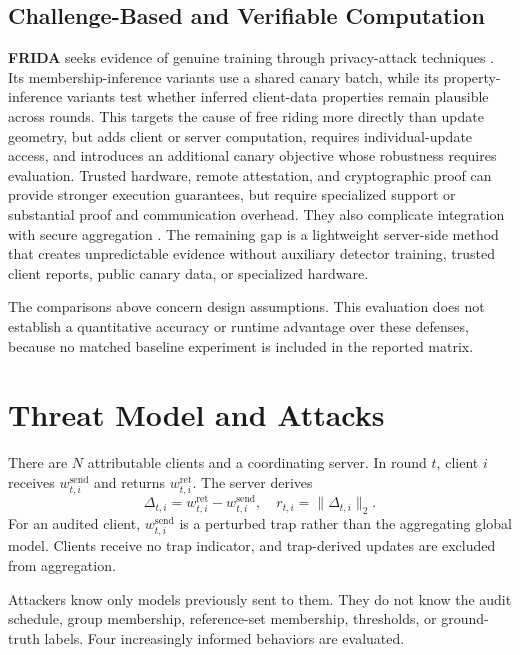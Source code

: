 \documentclass[conference]{IEEEtran}
\begin{document}
\subsection{Challenge-Based and Verifiable Computation}
\textbf{FRIDA} seeks evidence of genuine training through privacy-attack techniques \cite{recasens2024frida}. Its membership-inference variants use a shared canary batch, while its property-inference variants test whether inferred client-data properties remain plausible across rounds. This targets the cause of free riding more directly than update geometry, but adds client or server computation, requires individual-update access, and introduces an additional canary objective whose robustness requires evaluation. Trusted hardware, remote attestation, and cryptographic proof can provide stronger execution guarantees, but require specialized support or substantial proof and communication overhead. They also complicate integration with secure aggregation \cite{bonawitz2017practical}. The remaining gap is a lightweight server-side method that creates unpredictable evidence without auxiliary detector training, trusted client reports, public canary data, or specialized hardware.


The comparisons above concern design assumptions. This evaluation does not establish a quantitative accuracy or runtime advantage over these defenses, because no matched baseline experiment is included in the reported matrix.
\section{Threat Model and Attacks}

There are $N$ attributable clients and a coordinating server. In round $t$, client $i$ receives $w^{\mathrm{send}}_{t,i}$ and returns $w^{\mathrm{ret}}_{t,i}$. The server derives
\begin{equation}
\Delta_{t,i}=w^{\mathrm{ret}}_{t,i}-w^{\mathrm{send}}_{t,i},
\quad r_{t,i}=\lVert\Delta_{t,i}\rVert_2.
\end{equation}
For an audited client, $w^{\mathrm{send}}_{t,i}$ is a perturbed trap rather than the aggregating global model. Clients receive no trap indicator, and trap-derived updates are excluded from aggregation.

Attackers know only models previously sent to them. They do not know the audit schedule, group membership, reference-set membership, thresholds, or ground-truth labels. Four increasingly informed behaviors are evaluated.
\end{document}
